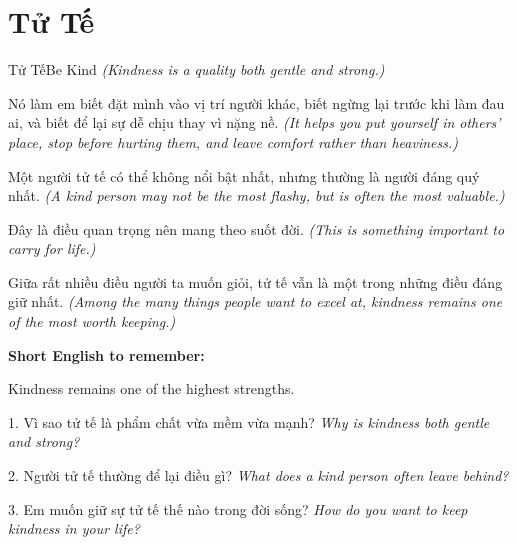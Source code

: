 \section{Tử Tế}
\begin{truyen}{Tử Tế}{Be Kind}
\textit{(Kindness is a quality both gentle and strong.)}

Nó làm em biết đặt mình vào vị trí người khác, biết ngừng lại trước khi làm đau ai, và biết để lại sự dễ chịu thay vì nặng nề.
\textit{(It helps you put yourself in others' place, stop before hurting them, and leave comfort rather than heaviness.)}

Một người tử tế có thể không nổi bật nhất, nhưng thường là người đáng quý nhất.
\textit{(A kind person may not be the most flashy, but is often the most valuable.)}

Đây là điều quan trọng nên mang theo suốt đời.
\textit{(This is something important to carry for life.)}
\end{truyen}

\begin{baihoc}
Giữa rất nhiều điều người ta muốn giỏi, tử tế vẫn là một trong những điều đáng giữ nhất.
\textit{(Among the many things people want to excel at, kindness remains one of the most worth keeping.)}
\end{baihoc}

\begin{ghinhoanh}
\textbf{Short English to remember:}

Kindness remains one of the highest strengths.

\end{ghinhoanh}

\begin{tuhocnhanh}
1. Vì sao tử tế là phẩm chất vừa mềm vừa mạnh? \textit{Why is kindness both gentle and strong?}

2. Người tử tế thường để lại điều gì? \textit{What does a kind person often leave behind?}

3. Em muốn giữ sự tử tế thế nào trong đời sống? \textit{How do you want to keep kindness in your life?}
\end{tuhocnhanh}
\ngancach

